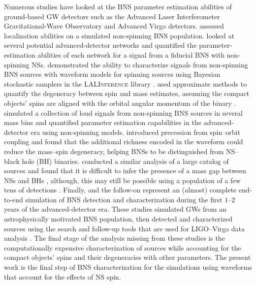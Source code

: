 Numerous studies have looked at the BNS parameter estimation abilities of ground-based GW detectors such as the Advanced Laser Interferometer Gravitational-Wave Observatory \citep[aLIGO;][]{Aasi_2015} and Advanced Virgo \citep[AdV;][]{Acernese_2014} detectors. \citet{Nissanke_2010,Nissanke_2011} assessed localization abilities on a simulated non-spinning BNS population. \citet{Veitch_2012} looked at several potential advanced-detector networks and quantified the parameter-estimation abilities of each network for a signal from a fiducial BNS with non-spinning NSs. \citet{Aasi_2013} demonstrated the ability to characterize signals from non-spinning BNS sources with waveform models for spinning sources using Bayesian stochastic samplers in the \textsc{LALInference} library \citep{Veitch_2014}.  \citet{Hannam_2013} used approximate methods to quantify the degeneracy between spin and mass estimates, assuming the compact objects' spins are aligned with the orbital angular momentum of the binary \citep[but see][]{Haster_2015}. \citet{Rodriguez_2014} simulated a collection of loud signals from non-spinning BNS sources in several mass bins and quantified parameter estimation capabilities in the advanced-detector era using non-spinning models.  \citet{Chatziioannou_2014} introduced precession from spin--orbit coupling and found that the additional richness encoded in the waveform could reduce the mass--spin degeneracy, helping BNSs to be distinguished from NS--black hole (BH) binaries. \citet{Littenberg:2015tpa} conducted a similar analysis of a large catalog of sources and found that it is difficult to infer the presence of a mass gap between NSs and BHs \citep{Ozel:2010su,Farr:2010tu,Kreidberg:2012ud}, although, this may still be possible using a population of a few tens of detections \citep{Mandel:2015spa}.  Finally, \citet{Singer_2014} and the follow-on \citet{Berry_2014} represent an (almost) complete end-to-end simulation of BNS detection and characterization during the first $1$--$2$ years of the advanced-detector era. These studies simulated GWs from an astrophysically motivated BNS population, then detected and characterized sources using the search and follow-up tools that are used for LIGO--Virgo data analysis \citep{WhitePaper2014,TheLIGOScientific:2016wfe}.   The final stage of the analysis missing from these studies is the computationally expensive characterization of sources while accounting for the compact objects' spins and their degeneracies with other parameters.  The present work is the final step of BNS characterization for the \citet{Singer_2014} simulations using waveforms that account for the effects of NS spin.

